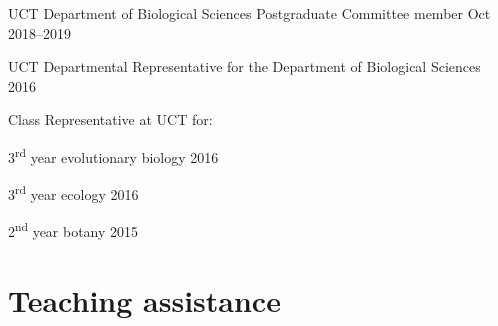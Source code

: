 \documentclass[10pt]{article}
\begin{document}
UCT Department of Biological Sciences Postgraduate Committee member
                                                           \hfill Oct 2018--2019

UCT Departmental Representative for the Department of Biological Sciences
                                                                     \hfill 2016

Class Representative at UCT for:

\hspace{2em} 3\textsuperscript{rd} year evolutionary biology         \hfill 2016

\hspace{2em} 3\textsuperscript{rd} year ecology                      \hfill 2016

\hspace{2em} 2\textsuperscript{nd} year botany                       \hfill 2015

\clearpage %

\section*{Teaching assistance} %

\end{document}
